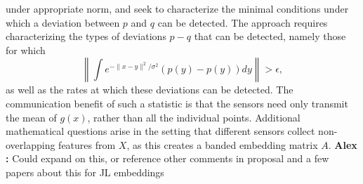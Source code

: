 \documentclass{article}
\newcommand{\comment}[3]{{\color{#1} {\bf #2 :} #3}}
\newcommand{\yoav}[1]{\comment{magenta}{Yoav}{#1}}
\newcommand{\rayan}[1]{\comment{red}{Rayan}{#1}}
\newcommand{\alex}[1]{\comment{green}{Alex}{#1}}
\begin{document}
\begin{itemize}
under appropriate norm, and seek to characterize the minimal conditions under which a deviation between $p$ and $q$ can be detected.   The approach requires characterizing the types of deviations $p - q$ that can be detected, namely those for which $$\left\|\int e^{-\|x-y\|^2/\sigma^2} (p(y) - p(y)) dy \right\| > \epsilon,$$ as well as the rates at which these deviations can be detected.
The communication benefit of such a statistic is that the sensors need only transmit the mean of $g(x)$, rather than all the individual points.  Additional mathematical questions arise in the setting that different sensors collect non-overlapping features from $X$, as this creates a banded embedding matrix $A$. \alex{Could expand on this, or reference other comments in proposal and a few papers about this for JL embeddings}


\end{itemize}
\end{document}
